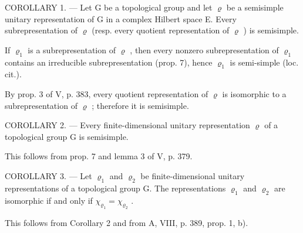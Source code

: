 COROLLARY 1. --- Let G be a topological group and let \(\varrho\) be a semisimple unitary representation of G in a complex Hilbert space E. Every subrepresentation of \(\varrho\) (resp. every quotient representation of \(\varrho\) ) is semisimple.

If \(\varrho_{1}\) is a subrepresentation of \(\varrho\) , then every nonzero subrepresentation of \(\varrho_{1}\) contains an irreducible subrepresentation (prop. 7), hence \(\varrho_{1}\) is semi-simple (loc. cit.).

By prop. 3 of V, p. 383, every quotient representation of \(\varrho\) is isomorphic to a subrepresentation of \(\varrho\) ; therefore it is semisimple.

COROLLARY 2. --- Every finite-dimensional unitary representation \(\varrho\) of a topological group G is semisimple.

This follows from prop. 7 and lemma 3 of V, p. 379.

COROLLARY 3. --- Let \(\varrho_{1}\) and \(\varrho_{2}\) be finite-dimensional unitary representations of a topological group G. The representations \(\varrho_{1}\) and \(\varrho_{2}\) are isomorphic if and only if \(\chi_{\varrho_{1}} = \chi_{\varrho_{2}}\) .

This follows from Corollary 2 and from A, VIII, p. 389, prop. 1, b).

